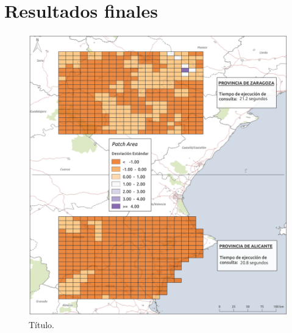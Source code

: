 \chapter{Resultados finales}\label{anex:results}

\begin{figure}
\begin{center}
\includegraphics[width=\textwidth]{ResultadosyDiscusion/Figs/Results/p_25.png}
\caption{Título.}
\end{center}
\end{figure}

